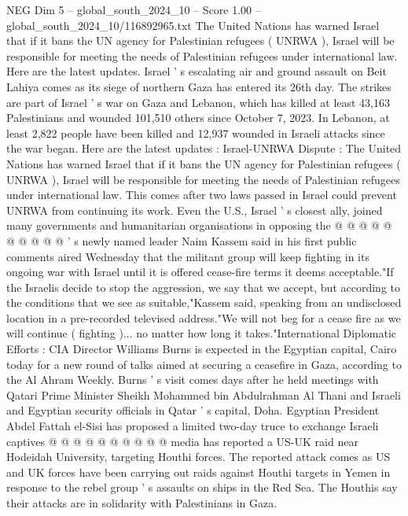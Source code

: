\begin{textsample}{NEG Dim 5 – global\_south\_2024\_10 – Score 1.00 – global\_south\_2024\_10/116892965.txt}  \label{ex:f5_neg_102}
The United Nations has warned Israel that if it bans the UN agency for Palestinian refugees ( UNRWA ), Israel will be responsible for meeting the needs of Palestinian refugees under international law.
Here are the latest updates.
Israel ' s escalating air and ground assault on Beit Lahiya comes as its siege of northern Gaza has entered its 26th day.
The strikes are part of Israel ' s war on Gaza and Lebanon, which has killed at least 43,163 Palestinians and wounded 101,510 others since October 7, 2023.
In Lebanon, at least 2,822 people have been killed and 12,937 wounded in Israeli attacks since the war began.
Here are the latest updates : Israel-UNRWA Dispute : The United Nations has warned Israel that if it bans the UN agency for Palestinian refugees ( UNRWA ), Israel will be responsible for meeting the needs of Palestinian refugees under international law.
This comes after two laws passed in Israel could prevent UNRWA from continuing its work.
Even the U.S., Israel ' s closest ally, joined many governments and humanitarian organisations in opposing the @ @ @ @ @ @ @ @ @ @ ' s newly named leader Naim Kassem said in his first public comments aired Wednesday that the militant group will keep fighting in its ongoing war with Israel until it is offered cease-fire terms it deems acceptable."If the Israelis decide to stop the aggression, we say that we accept, but according to the conditions that we see as suitable,"Kassem said, speaking from an undisclosed location in a pre-recorded televised address."We will not beg for a cease fire as we will continue ( fighting )... no matter how long it takes."International Diplomatic Efforts : CIA Director Williams Burns is expected in the Egyptian capital, Cairo today for a new round of talks aimed at securing a ceasefire in Gaza, according to the Al Ahram Weekly.
Burns ' s visit comes days after he held meetings with Qatari Prime Minister Sheikh Mohammed bin Abdulrahman Al Thani and Israeli and Egyptian security officials in Qatar ' s capital, Doha.
Egyptian President Abdel Fattah el-Sisi has proposed a limited two-day truce to exchange Israeli captives @ @ @ @ @ @ @ @ @ @ media has reported a US-UK raid near Hodeidah University, targeting Houthi forces.
The reported attack comes as US and UK forces have been carrying out raids against Houthi targets in Yemen in response to the rebel group ' s assaults on ships in the Red Sea.
The Houthis say their attacks are in solidarity with Palestinians in Gaza.

\end{textsample}
